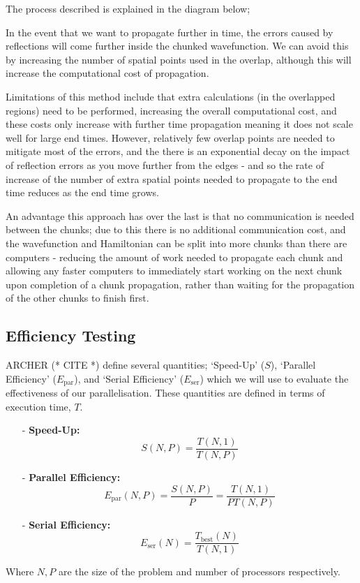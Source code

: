 The process described is explained in the diagram below;



In the event that we want to propagate further in time, the errors caused by reflections will come further inside the chunked wavefunction. We can avoid this by increasing the number of spatial points used in the overlap, although this will increase the computational cost of propagation. 

Limitations of this method include that extra calculations (in the overlapped regions) need to be performed, increasing the overall computational cost, and these costs only increase with further time propagation meaning it does not scale well for large end times. However, relatively few overlap points are needed to mitigate most of the errors, and the there is an exponential decay on the impact of reflection errors as you move further from the edges - and so the rate of increase of the number of extra spatial points needed to propagate to the end time reduces as the end time grows. 

An advantage this approach has over the last is that no communication is needed between the chunks; due to this there is no additional communication cost, and the wavefunction and Hamiltonian can be split into more chunks than there are computers - reducing the amount of work needed to propagate each chunk and allowing any faster computers to immediately start working on the next chunk upon completion of a chunk propagation, rather than waiting for the propagation of the other chunks to finish first.

\subsection{Efficiency Testing}
ARCHER (* CITE *) define several quantities; `Speed-Up' ($S$), `Parallel Efficiency' ($E_{\text{par}}$), and `Serial Efficiency' ($E_{\text{ser}}$) which we will use to evaluate the effectiveness of our parallelisation. These quantities are defined in terms of execution time, $T$.
\begin{itemize}
	\item[-]{\textbf{Speed-Up: }
		$$
		S\left(N,P\right) = \frac{T\left(N,1\right)}{T\left(N,P\right)}
		$$}

	\item[-]{\textbf{Parallel Efficiency: }
		$$
		E_{\text{par}}\left(N,P\right) = \frac{S\left(N,P\right)}{P} = \frac{T\left(N,1\right)}{PT\left(N,P\right)}
		$$}

	\item[-]{\textbf{Serial Efficiency: }
		$$
		E_{\text{ser}}\left(N\right) = \frac{T_{\text{best}}\left(N\right)}{T\left(N,1\right)}
		$$}
\end{itemize}
Where $N, P$ are the size of the problem and number of processors respectively.

